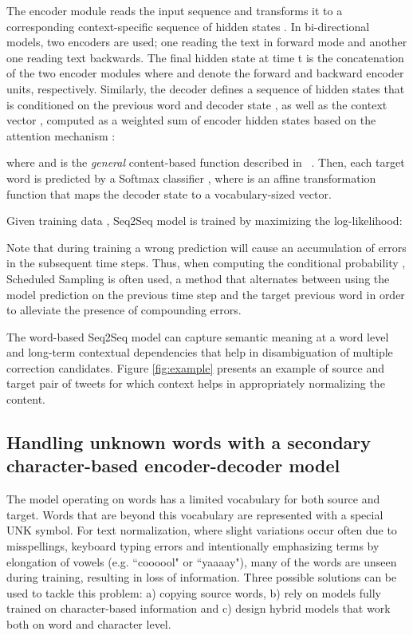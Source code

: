 \documentclass[letterpaper]{article} \usepackage{aaai19}  \usepackage{times}  \usepackage{helvet} \usepackage{courier}  \usepackage[hyphens]{url}  \usepackage{graphicx} \urlstyle{rm} \def\UrlFont{\rm}  \usepackage{graphicx}  \frenchspacing  \setlength{\pdfpagewidth}{8.5in}  \setlength{\pdfpageheight}{11in}
\newcommand{\citet}[1]{\citeauthor{#1}~\shortcite{#1}}
\newcommand{\citep}{\cite}
\begin{document}
The encoder module reads the input sequence  and transforms it to a corresponding context-specific sequence of hidden states . In bi-directional models, two encoders are used; one reading the text in forward mode and another one reading text backwards. The final hidden state at time t  is the concatenation of the two encoder modules  where  and  denote the forward and backward encoder units, respectively. Similarly, the decoder defines a sequence of hidden states  that is conditioned on the previous word  and decoder state , as well as the context vector , computed as a weighted sum of encoder hidden states based on the attention mechanism \citep{bahdanau2014neural}:

where  and  is the \textit{general} content-based function described in \citet{luong2015effective}. Then, each target word is predicted by a Softmax classifier  , where  is an affine transformation function that maps the decoder state to a vocabulary-sized vector.

Given training data , Seq2Seq model is trained by maximizing the log-likelihood:

Note that during training a wrong prediction will cause an accumulation of errors in the subsequent time steps. Thus, when computing the conditional probability , Scheduled Sampling \citep{bengio2015scheduled} is often used, a method that alternates between using the model prediction on the previous time step  and the target previous word  in order to alleviate the presence of compounding errors.

The word-based Seq2Seq model can capture semantic meaning at a word level and long-term contextual dependencies that help in disambiguation of multiple correction candidates. Figure \ref{fig:example} presents an example of source and target pair of tweets for which context helps in appropriately normalizing the content.


\subsection{Handling unknown words with a secondary character-based encoder-decoder model}

The model operating on words has a limited vocabulary for both source and target. Words that are beyond this vocabulary are represented with a special UNK symbol. For text normalization, where slight variations occur often due to misspellings, keyboard typing errors and intentionally emphasizing terms by elongation of vowels (e.g. ``coooool" or ``yaaaay"), many of the words are unseen during training, resulting in loss of information. Three possible solutions can be used to tackle this problem: a) copying source words, b) rely on models fully trained on character-based information and c) design hybrid models that work both on word and character level.
\end{document}
